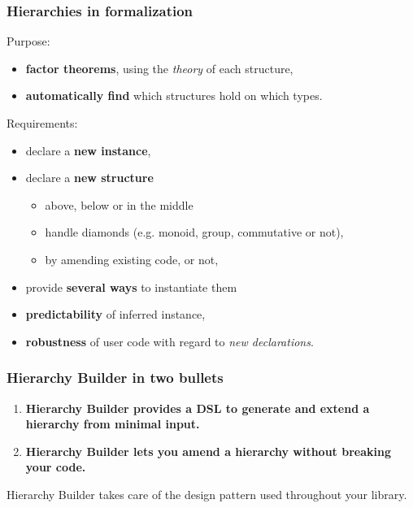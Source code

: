 \documentclass[11pt]{beamer}
\begin{document}
\begin{frame}
  \frametitle{Hierarchies in formalization}

  Purpose:
  \begin{itemize}
  \item \textbf{factor theorems}, using the \emph{theory} of each structure,
  \item \textbf{automatically find} which structures hold on which types.
  \end{itemize}

  \pause
  \vfill

  Requirements:
  \begin{itemize}
  \item declare a \textbf{new instance},
  \pause
  \item declare a \textbf{new structure}
    \begin{itemize}
    \item above, below or in the middle
    \item handle diamonds (e.g. monoid, group, commutative or not),
    \item by amending existing code, or not,
    \end{itemize}
    \pause
  \item provide \textbf{several ways} to instantiate them
  \pause
  \item \textbf{predictability} of inferred instance,
  \pause
  \item \textbf{robustness} of user code with regard to \textit{new declarations}.
  \end{itemize}

\end{frame}

\begin{frame}
  \frametitle{Hierarchy Builder in two bullets}

  \begin{enumerate}
  \item \textbf{Hierarchy Builder provides a DSL to generate and extend a
      hierarchy from minimal input.}
    \vfill
  \item \textbf{Hierarchy Builder lets you amend a hierarchy without
      breaking your code.}
  \end{enumerate}

  \vfill

  Hierarchy Builder takes care of the design pattern used throughout
  your library.
\end{frame}
\end{document}

